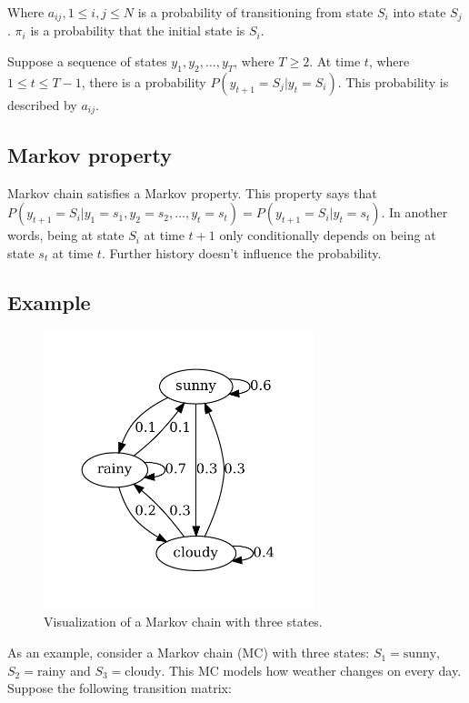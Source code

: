 \documentclass[thesis=B,english]{FITthesis}[2012/06/26]
\begin{document}
Where $a_{ij}, 1 \leq i,j \leq N$ is a probability of transitioning from state $S_i$ into state $S_j$. $\pi_i$ is a probability that the initial state is $S_i$.

Suppose a sequence of states $y_1, y_2, \dots, y_T$, where $T \geq 2$. At time $t$, where $1 \leq t \leq T-1$, there is a probability $P(y_{t+1}=S_j | y_t=S_i)$. This probability is described by $a_{ij}$.

\subsection{Markov property}
Markov chain satisfies a Markov property. This property says that $P(y_{t+1}=S_i|y_1=s_1,y_2=s_2,\dots,y_t=s_t) = P(y_{t+1}=S_{i}|y_t=s_t)$. In another words, being at state $S_i$ at time $t+1$ only conditionally depends on being at state $s_t$ at time $t$. Further history doesn't influence the probability.

\subsection{Example}

\begin{figure}
	\centering
 	\includegraphics[width=0.7\textwidth]{mc}
 	\caption{Visualization of a Markov chain with three states.}
 	\label{fig:mc}
\end{figure}

As an example, consider a Markov chain (MC) with three states: $S_1 = \text{sunny}$, $S_2 = \text{rainy}$ and $S_3 = \text{cloudy}$. This MC models how weather changes on every day. Suppose the following transition matrix:
\end{document}
